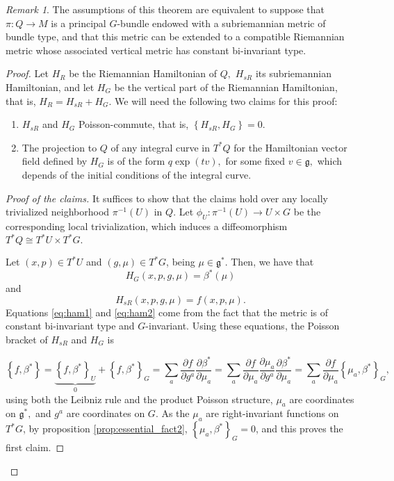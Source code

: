 \documentclass[12pt, letterpaper, reqno]{amsart}
\theoremstyle{definition}
\theoremstyle{plain}
\theoremstyle{remark}
\newtheorem{rem}{Remark}
\begin{document}
\begin{rem}
The assumptions of this theorem are equivalent to suppose that $ \pi: Q \rightarrow  M $ is a principal $ G $-bundle endowed with a subriemannian metric of bundle type, and that this metric can be extended to a compatible Riemannian metric whose associated vertical metric has constant bi-invariant type.	
\end{rem}
\begin{proof}
	Let $ H_R $ be the Riemannian Hamiltonian of $ Q, $ $ H_{sR} $ its subriemannian Hamiltonian, and let $ H_G$ be the vertical part of the Riemannian Hamiltonian, that is, $ H_R = H_{sR}+H_G. $  We will need the following two claims for this proof:
	\begin{enumerate}
		\item $ H_{sR} $ and $ H_G $ Poisson-commute, that is, $ \left\{ H_{sR}, H_G \right\} =0. $ 
		\item The projection to $ Q $ of any integral curve in $ T^*Q $ for the Hamiltonian vector field defined by $ H_G $ is of the form $ q \operatorname{exp}(tv),  $ for some fixed $ v\in \mathfrak{g}, $ which depends of the initial conditions of the integral curve.
	\end{enumerate}
	\begin{proof}
		[Proof of the claims] It suffices to show that the claims hold over any locally trivialized neighborhood $ \pi^{-1}(U) $ in $ Q. $ Let $ \phi_U: \pi^{-1}(U) \rightarrow U\times G $ be the corresponding local trivialization, which induces a diffeomorphism $ T^*Q \cong T^*U\times T^*G.$

		Let $ (x,p)\in T^* U $ and $ (g,\mu)\in T^*G $, being $ \mu\in \mathfrak{g}^*. $ Then, we have that
		\begin{equation}\label{eq:ham1}
			H_G(x,p,g,\mu) = \beta^*(\mu)
		\end{equation}
		and
		\begin{equation}\label{eq:ham2}
			H_{sR}(x,p,g,\mu)= f(x,p,\mu).	
		\end{equation}
		Equations \eqref{eq:ham1} and \eqref{eq:ham2} come from the fact that the metric is of constant bi-invariant type and $ G $-invariant. Using these equations, the Poisson bracket of $ H_{sR} $ and $ H_{G} $ is

		$$ \left\{ f,\beta^* \right\} = \underbrace{\left\{ f,\beta^* \right\}_U}_0 + \left\{ f,\beta^* \right\}_G = \sum^{}_{a} \frac{\partial f}{\partial g^a} \frac{\partial \beta^*}{\partial \mu_a} = \sum^{}_{a} \frac{\partial f}{\partial \mu_a} \frac{\partial \mu_a}{\partial g^a} \frac{\partial \beta^*}{\partial \mu_a}  = \sum^{}_{a} \frac{\partial f}{\partial \mu_a} \left\{ \mu_a, \beta^* \right\}_G, $$ 
		using both the Leibniz rule and the product Poisson structure, $ \mu_a $ are coordinates on $ \mathfrak{g}^*, $ and $ g^a $ are coordinates on $ G. $ As the $ \mu_a $ are right-invariant functions on $ T^*G$, by proposition \ref{prop:essential_fact2}, $ \left\{ \mu_a,\beta^* \right\}_G =0 $, and this proves the first claim.


\end{proof}
\end{proof}
\end{document}
